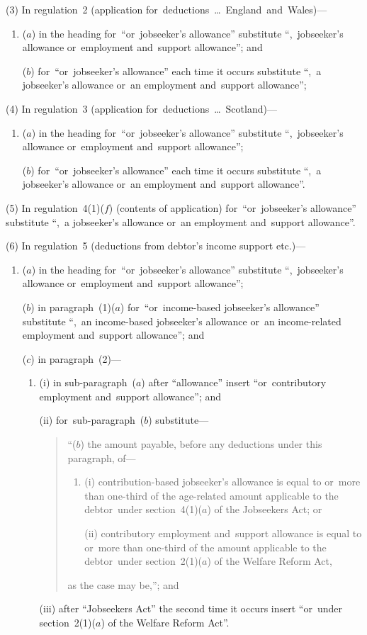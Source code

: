 \documentclass[12pt,a4paper]{article}
\begin{document}
(3) In regulation~2 (application for~deductions~\dots\ England~and~Wales)—
\begin{enumerate}\item[]
($a$) in the heading for~“or~jobseeker’s allowance” substitute “,~jobseeker’s allowance or~employment and~support allowance”; and

($b$) for~“or~jobseeker’s allowance” each time it occurs substitute “,~a jobseeker’s allowance or~an employment and~support allowance”;
\end{enumerate}

(4) In regulation~3 (application for~deductions~\dots\ Scotland)—
\begin{enumerate}\item[]
($a$) in the heading for~“or~jobseeker’s allowance” substitute “,~jobseeker’s allowance or~employment and~support allowance”;

($b$) for~“or~jobseeker’s allowance” each time it occurs substitute “,~a jobseeker’s allowance or~an employment and~support allowance”.
\end{enumerate}

(5) In regulation~4(1)($f$)  (contents of application) for~“or~jobseeker’s allowance” substitute “,~a jobseeker’s allowance or~an employment and~support allowance”.

(6) In regulation~5 (deductions from debtor’s income support etc.)—
\begin{enumerate}\item[]
($a$) in the heading for~“or~jobseeker’s allowance” substitute “,~jobseeker’s allowance or~employment and~support allowance”;

($b$) in paragraph~(1)($a$)  for~“or~income-based jobseeker’s allowance” substitute “,~an income-based jobseeker’s allowance or~an income-related employment and~support allowance”; and

($c$) in paragraph~(2)—
\begin{enumerate}\item[]
(i) in sub-paragraph~($a$)  after “allowance” insert “or~contributory employment and~support allowance”; and

(ii) for~sub-paragraph~($b$)  substitute—
\begin{quotation}
“($b$) the amount payable, before any deductions under this paragraph, of—
\begin{enumerate}\item[]
(i) contribution-based jobseeker’s allowance is equal to or~more than one-third of the age-related amount applicable to the debtor~under section~4(1)($a$)  of the Jobseekers Act; or

(ii) contributory employment and~support allowance is equal to or~more than one-third of the amount applicable to the debtor~under section~2(1)($a$)  of the Welfare Reform Act,
\end{enumerate}
as the case may be,”; and
\end{quotation}

(iii) after “Jobseekers Act” the second time it occurs insert “or~under section~2(1)($a$)  of the Welfare Reform Act”.
\end{enumerate}
\end{enumerate}
\end{document}
